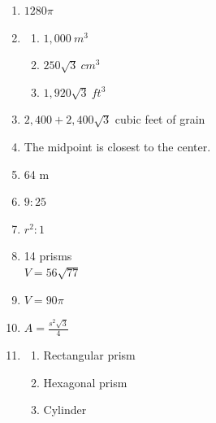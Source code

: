 \documentclass{article}
\begin{document}
\begin{enumerate}
\begin{enumerate}
	\item --
	
	\item 72 bars
	
	\item $V_{bar} = \frac{ \sqrt{3} }{2} \ in.^3$ \\
		$V_{box} = 36\sqrt{3} \ in.^3$
	
	\end{enumerate}
	
\item $1280 \pi$

\item

	\begin{enumerate}
	
	\item $1,000 \ m^3$
	
	\item $250\sqrt{3} \ cm^3$
	
	\item $1,920\sqrt{3} \ ft^3$
	
	\end{enumerate}
	
\item $2,400 + 2,400 \sqrt{3}$ cubic feet of grain

\item The midpoint is closest to the center.

\item 64 m

\item $9:25$

\item $r^2:1$

\item 14 prisms \\
	$V = 56 \sqrt{77}$
	
\item $V = 90 \pi$

\item $A = \frac{s^2 \sqrt{3}}{4}$

\item

	\begin{enumerate}
	
	\item  Rectangular prism
	
	\item Hexagonal prism
	
	\item Cylinder
	

\end{enumerate}
\end{enumerate}
\end{document}
